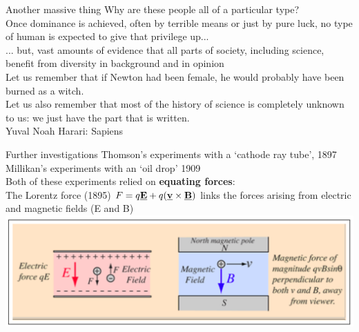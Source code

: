 \begin{frame}{Another massive thing}
\small
Why are these people all of a particular type?\\[1ex]
Once dominance is achieved, often by terrible means or just by pure luck, no type of human is expected to give that privilege up...\\[1ex]
... but, vast amounts of evidence that all parts of society, including science, benefit from diversity in background and in opinion\\[1ex]
Let us remember that if Newton had been female, he would probably have been burned as a witch.\\[1ex]
Let us also remember that most of the history of science is completely unknown to us: we just have the part that is written.\\[2ex]

\tiny
Yuval Noah Harari:  Sapiens
\end{frame}

\begin{frame}{Further investigations}
\small
Thomson's experiments with a `cathode ray tube', 1897\\[1ex]
Millikan's experiments with an `oil drop' 1909\\[1ex]

Both of these experiments relied on \textbf{equating forces}:\\[1ex]

The Lorentz force (1895) $F = q\underline{\mathbf{E}} +q (\underline{\mathbf{v}} \times \underline{\mathbf{B}})$  links the forces arising from electric and magnetic fields (E and B)\\[1ex]

\includegraphics[scale=0.3]{lorentz}
\end{frame}


